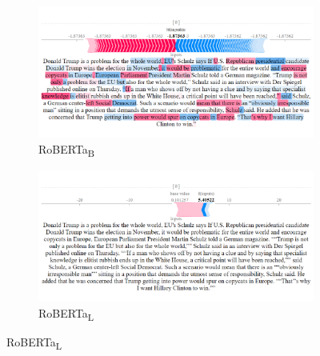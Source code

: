 \begin{figure}[!h]
    \begin{subfigure}[t]{0.35\textwidth}
        \includegraphics[width=\textwidth]{figs/news_T/roberta-b.png}
        \caption{{RoBERTa}\textsubscript{B}}
    \end{subfigure}
    \hspace{\fill} %
    \begin{subfigure}[t]{0.35\textwidth}
        \includegraphics[width=\linewidth]{figs/news_T/roberta-l.png}
        \caption{{RoBERTa}\textsubscript{L}}
    \end{subfigure}




\end{figure}
